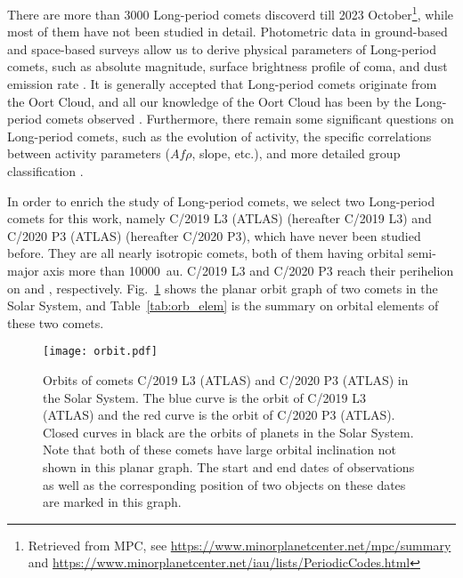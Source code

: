 There are more than \num{3000} Long-period comets discoverd till 2023 October\footnote{Retrieved from MPC, see \url{https://www.minorplanetcenter.net/mpc/summary} and \url{https://www.minorplanetcenter.net/iau/lists/PeriodicCodes.html}}, while most of them have not been studied in detail. Photometric data in ground-based and space-based surveys allow us to derive physical parameters of Long-period comets, such as absolute magnitude, surface brightness profile of coma, and dust emission rate \citep{bauer_comet_2022, betzler_activity_2023}. It is generally accepted that Long-period comets originate from the Oort Cloud, and all our knowledge of the Oort Cloud has been  by the Long-period comets observed \citep{fouchard_what_2023}. Furthermore, there remain some significant questions on Long-period comets, such as the evolution of activity, the specific correlations between activity parameters ($Af\rho$, slope, etc.), and more detailed group classification \citep{sarneczky_activity_2016}. 

In order to enrich the study of Long-period comets, we select two Long-period comets for this work, namely C/2019 L3 (ATLAS) (hereafter C/2019 L3) and C/2020 P3 (ATLAS) (hereafter C/2020 P3), which have never been studied before. They are all nearly isotropic comets, both of them having orbital semi-major axis more than {\qty{10000}{\astronomicalunit}}. C/2019 L3 and C/2020 P3 reach their perihelion on  and , respectively. Fig.~\ref{fig:orbit} shows the planar orbit graph of two comets in the Solar System, and Table~\ref{tab:orb_elem} is the summary on orbital elements of these two comets. 

\begin{figure}
    \centering
    \texttt{[image: orbit.pdf]}
    \caption{Orbits of comets C/2019 L3 (ATLAS) and C/2020 P3 (ATLAS) in the Solar System. The blue curve is the orbit of C/2019 L3 (ATLAS) and the red curve is the orbit of C/2020 P3 (ATLAS). Closed curves in black are the orbits of planets in the Solar System. Note that both of these comets have large orbital inclination not shown in this planar graph. The start and end dates of observations as well as the corresponding position of two objects on these dates are marked in this graph. }
    \label{fig:orbit}
\end{figure}

